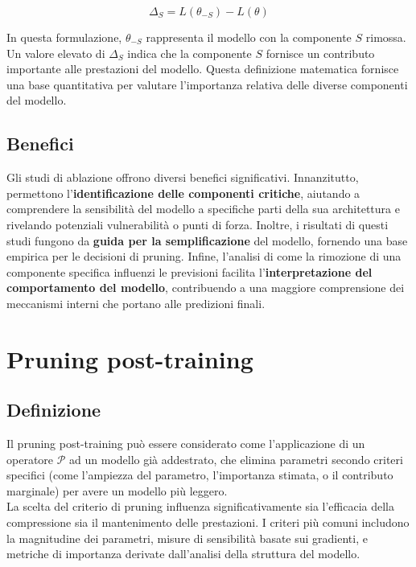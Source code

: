 \documentclass[a4paper,12pt]{report}
\begin{document}
	\[
	\Delta_S = L(\theta_{-S}) - L(\theta)
	\]
	
	In questa formulazione, $\theta_{-S}$ rappresenta il modello con la componente $S$ rimossa. Un valore elevato di $\Delta_S$ indica che la componente $S$ fornisce un contributo importante alle prestazioni del modello. Questa definizione matematica fornisce una base quantitativa per valutare l'importanza relativa delle diverse componenti del modello.
	
	\subsection{Benefici}
	Gli studi di ablazione offrono diversi benefici significativi. Innanzitutto, permettono l'\textbf{identificazione delle componenti critiche}, aiutando a comprendere la sensibilità del modello a specifiche parti della sua architettura e rivelando potenziali vulnerabilità o punti di forza. Inoltre, i risultati di questi studi fungono da \textbf{guida per la semplificazione} del modello, fornendo una base empirica per le decisioni di pruning. Infine, l'analisi di come la rimozione di una componente specifica influenzi le previsioni facilita l'\textbf{interpretazione del comportamento del modello}, contribuendo a una maggiore comprensione dei meccanismi interni che portano alle predizioni finali.
	
	\section{Pruning post-training}
	
	\subsection{Definizione}
	Il pruning post-training può essere considerato come l'applicazione di un operatore $\mathcal{P}$ ad un modello già addestrato, che elimina parametri secondo criteri specifici (come l'ampiezza del parametro, l'importanza stimata, o il contributo marginale) per avere un modello più leggero. \\
	La scelta del criterio di pruning influenza significativamente sia l'efficacia della compressione sia il mantenimento delle prestazioni. I criteri più comuni includono la magnitudine dei parametri, misure di sensibilità basate sui gradienti, e metriche di importanza derivate dall'analisi della struttura del modello.
	
\end{document}
